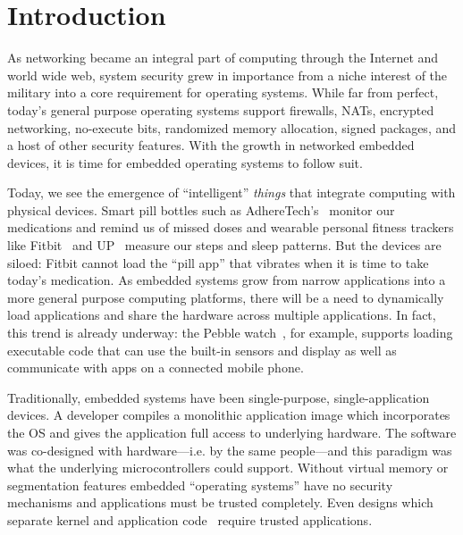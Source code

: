 \section{Introduction}

As networking became an integral part of computing through the Internet and
world wide web, system security grew in importance from a niche interest of the
military into a core requirement for operating systems. While far from perfect,
today's general purpose operating systems support firewalls, NATs, encrypted
networking, no-execute bits, randomized memory allocation, signed packages, and a
host of other security features. With the growth in networked embedded
devices, it is time for embedded operating systems to follow suit.

Today, we see the emergence of ``intelligent'' \textit{things} that integrate
computing with physical devices.
Smart pill bottles such as AdhereTech's~\cite{adheretech} monitor our
medications and remind us of missed doses and wearable personal fitness trackers
like Fitbit~\cite{fitbit} and UP~\cite{jawboneup} measure our steps and sleep
patterns. But the devices are siloed: Fitbit cannot load the ``pill app'' that
vibrates when it is time to take today's medication.
As embedded systems grow from narrow applications into a more general
purpose computing platforms, there will be a need to dynamically load
applications and share the hardware across multiple applications. In fact, this
trend is already underway: the Pebble watch~\cite{pebble}, for example, supports loading
executable code that can use the built-in sensors and display as well as
communicate with apps on a connected mobile phone.


Traditionally, embedded systems have been single-purpose, single-application
devices. A developer compiles a monolithic application image which incorporates
the OS and gives the application full access to underlying hardware.
The software was co-designed with hardware---i.e. by the same
people---and this paradigm was what the
underlying microcontrollers could support.
Without virtual memory or segmentation features
embedded ``operating systems'' have no
security mechanisms and applications must be trusted completely. Even designs
which separate kernel and application code~\cite{han05sos,contiki,freertos}
require trusted applications.

